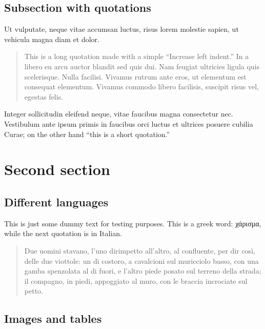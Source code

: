 \documentclass[american,a4paper,]{article}
\newcommand{\textgreek}[2][]{\foreignlanguage{greek}{#2}}
\newcommand{\textitalian}[2][]{\foreignlanguage{italian}{#2}}
\begin{document}
\hypertarget{subsection-with-quotations}{%
\subsection{Subsection with
quotations}\label{subsection-with-quotations}}

Ut vulputate, neque vitae accumsan luctus, risus lorem molestie sapien,
ut vehicula magna diam et dolor.

\begin{quote}
This is a long quotation made with a simple ``Increase left indent.'' In
a libero eu arcu auctor blandit sed quis dui. Nam feugiat ultricies
ligula quis scelerisque. Nulla facilisi. Vivamus rutrum ante eros, ut
elementum est consequat elementum. Vivamus commodo libero facilisis,
suscipit risus vel, egestas felis.
\end{quote}

Integer sollicitudin eleifend neque, vitae faucibus magna consectetur
nec. Vestibulum ante ipsum primis in faucibus orci luctus et ultrices
posuere cubilia Curae; on the other hand ``this is a short quotation.''

\hypertarget{second-section}{%
\section{Second section}\label{second-section}}

\hypertarget{different-languages}{%
\subsection{Different languages}\label{different-languages}}

This is just some dummy text for testing purposes. This is a greek word:
\textgreek{χάρισμα}, while the next quotation is in Italian.

\begin{quote}
\textitalian{Due uomini stavano, l'uno dirimpetto all'altro, al
confluente, per dir così, delle due viottole: un di costoro, a
cavalcioni sul muricciolo basso, con una gamba spenzolata al di fuori, e
l'altro piede posato sul terreno della strada; il compagno, in piedi,
appoggiato al muro, con le braccia incrociate sul petto.}
\end{quote}

\hypertarget{images-and-tables}{%
\subsection{Images and tables}\label{images-and-tables}}
\end{document}
